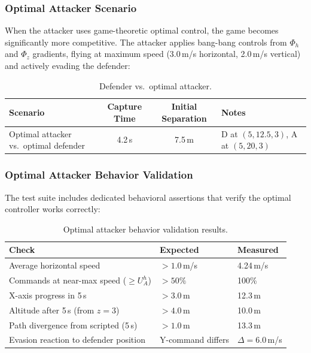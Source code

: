 \documentclass[11pt,a4paper]{article}
\begin{document}
\subsubsection{Optimal Attacker Scenario}

When the attacker uses game-theoretic optimal control, the game becomes significantly more competitive. The attacker applies bang-bang controls from $\Phi_h$ and $\Phi_z$ gradients, flying at maximum speed (3.0\,m/s horizontal, 2.0\,m/s vertical) and actively evading the defender:

\begin{table}[h]
\centering
\caption{Defender vs.\ optimal attacker.}
\begin{tabular}{lccl}
\toprule
\textbf{Scenario} & \textbf{Capture Time} & \textbf{Initial Separation} & \textbf{Notes} \\
\midrule
Optimal attacker vs.\ optimal defender & 4.2\,s & 7.5\,m & D at $(5, 12.5, 3)$, A at $(5, 20, 3)$ \\
\bottomrule
\end{tabular}
\end{table}

\subsubsection{Optimal Attacker Behavior Validation}

The test suite includes dedicated behavioral assertions that verify the optimal controller works correctly:

\begin{table}[h]
\centering
\caption{Optimal attacker behavior validation results.}
\begin{tabular}{lll}
\toprule
\textbf{Check} & \textbf{Expected} & \textbf{Measured} \\
\midrule
Average horizontal speed & $> 1.0$\,m/s & 4.24\,m/s \\
Commands at near-max speed ($\geq U_A^h$) & $> 50\%$ & 100\% \\
X-axis progress in 5\,s & $> 3.0$\,m & 12.3\,m \\
Altitude after 5\,s (from $z = 3$) & $> 4.0$\,m & 10.0\,m \\
Path divergence from scripted (5\,s) & $> 1.0$\,m & 13.3\,m \\
Evasion reaction to defender position & Y-command differs & $\Delta = 6.0$\,m/s \\
\bottomrule
\end{tabular}
\end{table}
\end{document}
